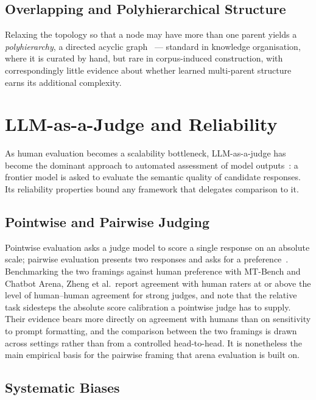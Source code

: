 \subsection*{Overlapping and Polyhierarchical Structure}

Relaxing the topology so that a node may have more than one parent
yields a \textit{polyhierarchy}, a directed acyclic
graph~\parencite{polyhierarchy2006} --- standard in knowledge
organisation, where it is curated by hand, but rare in corpus-induced
construction, with correspondingly little evidence about whether
learned multi-parent structure earns its additional complexity.


\section{LLM-as-a-Judge and Reliability}\label{sec:llm-as-a-judge}

As human evaluation becomes a scalability bottleneck, LLM-as-a-judge
has become the dominant approach to automated assessment of model
outputs~\parencite{zheng2023judging}: a frontier model is asked to
evaluate the semantic quality of candidate responses. Its reliability
properties bound any framework that delegates comparison to it.

\subsection*{Pointwise and Pairwise Judging}

Pointwise evaluation asks a judge model to score a single response on
an absolute scale; pairwise evaluation presents two responses and
asks for a preference~\parencite{zheng2023judging}. Benchmarking the
two framings against human preference with MT-Bench and Chatbot
Arena, Zheng et al.\ report agreement with human raters at or above
the level of human--human agreement for strong judges, and note that
the relative task sidesteps the absolute score calibration a
pointwise judge has to supply. Their evidence bears more directly on
agreement with humans than on sensitivity to prompt formatting, and
the comparison between the two framings is drawn across settings
rather than from a controlled head-to-head. It is nonetheless the
main empirical basis for the pairwise framing that arena evaluation
is built on.

\subsection*{Systematic Biases}

